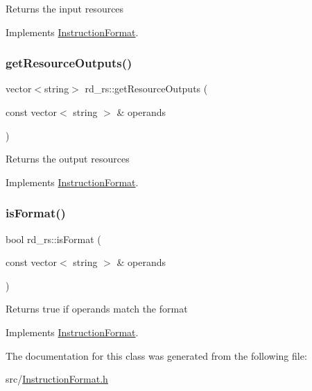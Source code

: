 Returns the input resources 

Implements \hyperlink{classInstructionFormat_a09775d3a3c22f40a0f44504664e586e4}{Instruction\+Format}.

\mbox{\label{classrd__rs_a52ac7e75ebef24ff1ac211d8dd0e4f5d}} 
\subsubsection{\texorpdfstring{get\+Resource\+Outputs()}{getResourceOutputs()}}
{\footnotesize\ttfamily vector$<$string$>$ rd\+\_\+rs\+::get\+Resource\+Outputs (\begin{DoxyParamCaption}\item[{const vector$<$ string $>$ \&}]{operands }\end{DoxyParamCaption})\hspace{0.3cm}{\ttfamily [virtual]}}

Returns the output resources 

Implements \hyperlink{classInstructionFormat_a95cd28ffb1bde59b67f676880ab10536}{Instruction\+Format}.

\mbox{\label{classrd__rs_a11e48da979b9ac645d90fc9bbdbfc444}} 
\subsubsection{\texorpdfstring{is\+Format()}{isFormat()}}
{\footnotesize\ttfamily bool rd\+\_\+rs\+::is\+Format (\begin{DoxyParamCaption}\item[{const vector$<$ string $>$ \&}]{operands }\end{DoxyParamCaption})\hspace{0.3cm}{\ttfamily [virtual]}}

Returns true if operands match the format 

Implements \hyperlink{classInstructionFormat_a9fdcf94dcd7d9a55ba86e7a63f04d1fe}{Instruction\+Format}.



The documentation for this class was generated from the following file\+:\begin{DoxyCompactItemize}
\item 
src/\hyperlink{InstructionFormat_8h}{Instruction\+Format.\+h}\end{DoxyCompactItemize}
